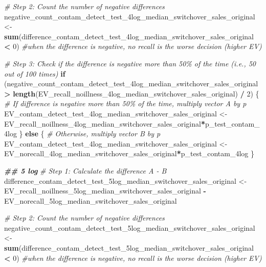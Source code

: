 \documentclass[
]{article}
\newenvironment{Shaded}{\begin{snugshade}}{\end{snugshade}}
\newcommand{\CommentTok}[1]{\textcolor[rgb]{0.56,0.35,0.01}{\textit{#1}}}
\newcommand{\ControlFlowTok}[1]{\textcolor[rgb]{0.13,0.29,0.53}{\textbf{#1}}}
\newcommand{\DecValTok}[1]{\textcolor[rgb]{0.00,0.00,0.81}{#1}}
\newcommand{\DocumentationTok}[1]{\textcolor[rgb]{0.56,0.35,0.01}{\textbf{\textit{#1}}}}
\newcommand{\FunctionTok}[1]{\textcolor[rgb]{0.13,0.29,0.53}{\textbf{#1}}}
\newcommand{\NormalTok}[1]{#1}
\newcommand{\OtherTok}[1]{\textcolor[rgb]{0.56,0.35,0.01}{#1}}
\newcommand{\SpecialCharTok}[1]{\textcolor[rgb]{0.81,0.36,0.00}{\textbf{#1}}}
\begin{document}
\begin{Shaded}
\begin{Highlighting}[]
\CommentTok{\# Step 2: Count the number of negative differences}
\NormalTok{negative\_count\_contam\_detect\_test\_4log\_median\_switchover\_sales\_original }\OtherTok{\textless{}{-}} \FunctionTok{sum}\NormalTok{(difference\_contam\_detect\_test\_4log\_median\_switchover\_sales\_original }\SpecialCharTok{\textless{}} \DecValTok{0}\NormalTok{) }\CommentTok{\#when the difference is negative, no recall is the worse decision (higher EV)}

\CommentTok{\# Step 3: Check if the difference is negative more than 50\% of the time (i.e., 50 out of 100 times)}
\ControlFlowTok{if}\NormalTok{ (negative\_count\_contam\_detect\_test\_4log\_median\_switchover\_sales\_original }\SpecialCharTok{\textgreater{}} \FunctionTok{length}\NormalTok{(EV\_recall\_noillness\_4log\_median\_switchover\_sales\_original) }\SpecialCharTok{/} \DecValTok{2}\NormalTok{) \{}
  \CommentTok{\# If difference is negative more than 50\% of the time, multiply vector A by p}
\NormalTok{  EV\_contam\_detect\_test\_4log\_median\_switchover\_sales\_original }\OtherTok{\textless{}{-}}\NormalTok{ EV\_recall\_noillness\_4log\_median\_switchover\_sales\_original}\SpecialCharTok{*}\NormalTok{p\_test\_contam\_4log}
\NormalTok{\} }\ControlFlowTok{else}\NormalTok{ \{}
  \CommentTok{\# Otherwise, multiply vector B by p}
\NormalTok{ EV\_contam\_detect\_test\_4log\_median\_switchover\_sales\_original  }\OtherTok{\textless{}{-}}\NormalTok{ EV\_norecall\_4log\_median\_switchover\_sales\_original}\SpecialCharTok{*}\NormalTok{p\_test\_contam\_4log}
\NormalTok{\}}


\DocumentationTok{\#\# 5 log}
\CommentTok{\# Step 1: Calculate the difference A {-} B}
\NormalTok{difference\_contam\_detect\_test\_5log\_median\_switchover\_sales\_original }\OtherTok{\textless{}{-}}\NormalTok{ EV\_recall\_noillness\_5log\_median\_switchover\_sales\_original }\SpecialCharTok{{-}}\NormalTok{ EV\_norecall\_5log\_median\_switchover\_sales\_original}

\CommentTok{\# Step 2: Count the number of negative differences}
\NormalTok{negative\_count\_contam\_detect\_test\_5log\_median\_switchover\_sales\_original }\OtherTok{\textless{}{-}} \FunctionTok{sum}\NormalTok{(difference\_contam\_detect\_test\_5log\_median\_switchover\_sales\_original }\SpecialCharTok{\textless{}} \DecValTok{0}\NormalTok{) }\CommentTok{\#when the difference is negative, no recall is the worse decision (higher EV)}


\end{Highlighting}
\end{Shaded}
\end{document}
